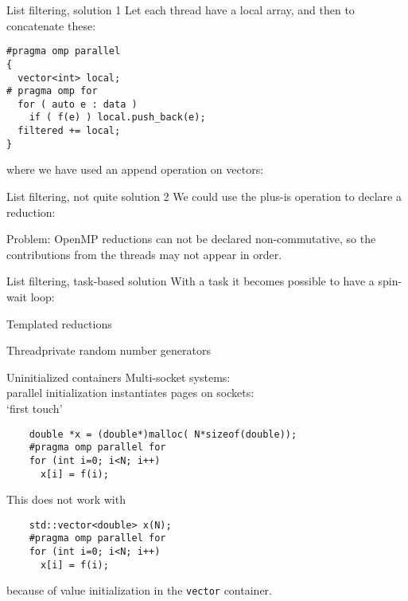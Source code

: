 \documentclass[11pt,headernav]{beamer}
\begin{document}
\begin{numberedframe}{List filtering, solution 1}
  Let each thread have a local array,
  and then to concatenate these:
\begin{lstlisting}
#pragma omp parallel
{
  vector<int> local;
# pragma omp for
  for ( auto e : data )
    if ( f(e) ) local.push_back(e);
  filtered += local;
}
\end{lstlisting}
where we have used an append operation on vectors:
\end{numberedframe}

\begin{numberedframe}{List filtering, not quite solution 2}
We could use the plus-is operation to declare a reduction:

Problem: OpenMP reductions can not be declared non-commutative,
so the contributions from the threads
may not appear in order.

\end{numberedframe}

\begin{numberedframe}{List filtering, task-based solution}
With a task it becomes possible to have a spin-wait loop:
\end{numberedframe}

\begin{numberedframe}{Templated reductions}
  
\end{numberedframe}


\begin{numberedframe}{Threadprivate random number generators}
  
\end{numberedframe}

\begin{numberedframe}{Uninitialized containers}
  Multi-socket systems:\\
  parallel initialization instantiates pages on sockets:\\
  `first touch'
  \begin{lstlisting}
    double *x = (double*)malloc( N*sizeof(double));
    #pragma omp parallel for
    for (int i=0; i<N; i++)
      x[i] = f(i);
  \end{lstlisting}
  This does not work with
  \begin{lstlisting}
    std::vector<double> x(N);
    #pragma omp parallel for
    for (int i=0; i<N; i++)
      x[i] = f(i);
  \end{lstlisting}
  because of value initialization in the \lstinline{vector} container.
\end{numberedframe}
\end{document}
